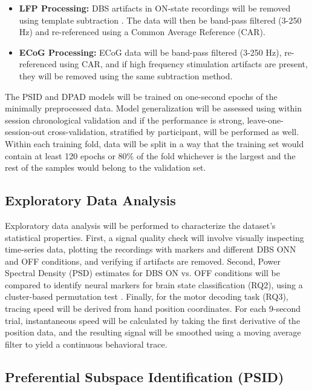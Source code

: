 \documentclass[12pt, letterpaper]{article}
\begin{document}
\begin{itemize}

    \item \textbf{LFP Processing:} DBS artifacts in ON-state recordings will be removed using template subtraction \parencite{qianMethodRemovalDeep2017,hammerArtifactCharacterizationMultipurpose2022}. The data will then be band-pass filtered (3-250 Hz) and re-referenced using a Common Average Reference (CAR).

    \item \textbf{ECoG Processing:} ECoG data will be band-pass filtered (3-250 Hz), re-referenced using CAR, and if high frequency stimulation artifacts are present, they will be removed using the same subtraction method.

\end{itemize}

The PSID and DPAD models will be trained on one-second epochs of the minimally preprocessed data. Model generalization will be assessed using within session chronological validation and if the performance is strong, leave-one-session-out cross-validation, stratified by participant, will be performed as well. Within each training fold, data will be split in a way that the training set would contain at least 120 epochs or 80\% of the fold whichever is the largest and the rest of the samples would belong to the validation set. 
\subsection{Exploratory Data Analysis}

Exploratory data analysis will be performed to characterize the dataset’s statistical properties. First, a signal quality check will involve visually inspecting time-series data, plotting the recordings with markers and different DBS ONN and OFF conditions, and verifying if artifacts are removed. Second, Power Spectral Density (PSD) estimates for DBS ON vs. OFF conditions will be compared to identify neural markers for brain state classification (RQ2), using a cluster-based permutation test \parencite{marisNonparametricStatisticalTesting2007}.
Finally, for the motor decoding task (RQ3), tracing speed will be derived from hand position coordinates. For each 9-second trial, instantaneous speed will be calculated by taking the first derivative of the position data, and the resulting signal will be smoothed using a moving average filter to yield a continuous behavioral trace.

\subsection{Preferential Subspace Identification (PSID)}
\end{document}
